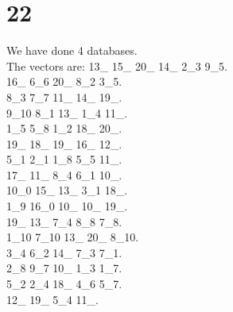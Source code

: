 \chapter{22}
\indent We have done 4 databases.\\
The vectors are:
13\_ 15\_ 20\_ 14\_ 2\_3 9\_5.\\16\_ 6\_6 20\_ 8\_2 3\_5.\\8\_3 7\_7 11\_ 14\_ 19\_.\\9\_10 8\_1 13\_ 1\_4 11\_.\\1\_5 5\_8 1\_2 18\_ 20\_.\\19\_ 18\_ 19\_ 16\_ 12\_.\\5\_1 2\_1 1\_8 5\_5 11\_.\\17\_ 11\_ 8\_4 6\_1 10\_.\\10\_0 15\_ 13\_ 3\_1 18\_.\\1\_9 16\_0 10\_ 10\_ 19\_.\\19\_ 13\_ 7\_4 8\_8 7\_8.\\1\_10 7\_10 13\_ 20\_ 8\_10.\\3\_4 6\_2 14\_ 7\_3 7\_1.\\2\_8 9\_7 10\_ 1\_3 1\_7.\\5\_2 2\_4 18\_ 4\_6 5\_7.\\12\_ 19\_ 5\_4 11\_.\\